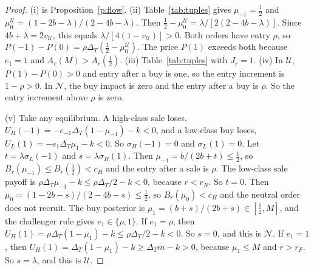 \documentclass[12pt]{article}
\theoremstyle{definition}
\newcommand{\cH}{c_H}
\begin{document}
\begin{proof}
(i) is Proposition~\ref{p:flow}.
(ii) Table~\ref{tab:tuples} gives $\mu_{-1}=\tfrac12$ and $\mu_0^{\mathcal U}=(1-2b-\lambda)/(2-4b-\lambda)$.
Then $\tfrac12-\mu_0^{\mathcal U}=\lambda/[2(2-4b-\lambda)]$.
Since $4b+\lambda=2v_{\mathcal U}$, this equals $\lambda/[4(1-v_{\mathcal U})]>0$.
Both orders have entry $\rho$, so $P(-1)-P(0)=\rho\Delta_T(\tfrac12-\mu_0^{\mathcal U})$.
The price $P(1)$ exceeds both because $e_1=1$ and $A_r(M)>A_r(\tfrac12)$.
(iii) Table~\ref{tab:tuples} with $J_r=1$.
(iv) In $\mathcal U$, $P(1)-P(0)>0$ and entry after a buy is one, so the entry increment is $1-\rho>0$.
In $\mathcal N$, the buy impact is zero and the entry after a buy is $\rho$.
So the entry increment above $\rho$ is zero.

(v) Take any equilibrium.
A high-class sale loses, $U_H(-1)=-e_{-1}\Delta_T(1-\mu_{-1})-k<0$, and a low-class buy loses, $U_L(1)=-e_1\Delta_T\mu_1-k<0$.
So $\sigma_H(-1)=0$ and $\sigma_L(1)=0$.
Let $t=\lambda\sigma_L(-1)$ and $s=\lambda\sigma_H(1)$.
Then $\mu_{-1}=b/(2b+t)\le\tfrac12$, so $B_r(\mu_{-1})\le B_r(\tfrac12)<\cH$ and the entry after a sale is $\rho$.
The low-class sale payoff is $\rho\Delta_T\mu_{-1}-k\le\rho\Delta_T/2-k<0$, because $r<r_N$.
So $t=0$.
Then $\mu_0=(1-2b-s)/(2-4b-s)\le\tfrac12$, so $B_r(\mu_0)<\cH$ and the neutral order does not recruit.
The buy posterior is $\mu_1=(b+s)/(2b+s)\in[\tfrac12,M]$, and the challenger rule gives $e_1\in\{\rho,1\}$.
If $e_1=\rho$, then $U_H(1)=\rho\Delta_T(1-\mu_1)-k\le\rho\Delta_T/2-k<0$.
So $s=0$, and this is $\mathcal N$.
If $e_1=1$, then $U_H(1)=\Delta_T(1-\mu_1)-k\ge\Delta_T m-k>0$, because $\mu_1\le M$ and $r>r_F$.
So $s=\lambda$, and this is $\mathcal U$.
\end{proof}
\end{document}
